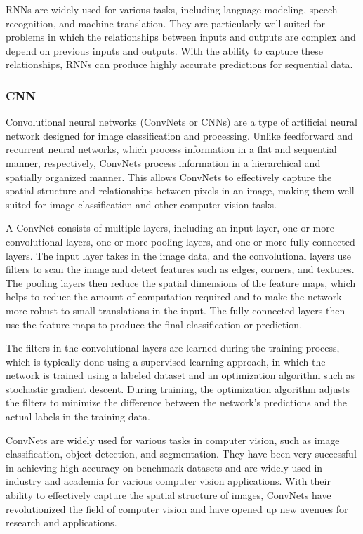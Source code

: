 \documentclass[12pt, a4paper, oneside]{article}
\begin{document}
RNNs are widely used for various tasks, including language modeling, speech recognition, and machine translation. They are particularly well-suited for problems in which the relationships between inputs and outputs are complex and depend on previous inputs and outputs. With the ability to capture these relationships, RNNs can produce highly accurate predictions for sequential data.
\subsubsection{CNN}
Convolutional neural networks (ConvNets or CNNs) are a type of artificial neural network designed for image classification and processing. Unlike feedforward and recurrent neural networks, which process information in a flat and sequential manner, respectively, ConvNets process information in a hierarchical and spatially organized manner. This allows ConvNets to effectively capture the spatial structure and relationships between pixels in an image, making them well-suited for image classification and other computer vision tasks.

A ConvNet consists of multiple layers, including an input layer, one or more convolutional layers, one or more pooling layers, and one or more fully-connected layers. The input layer takes in the image data, and the convolutional layers use filters to scan the image and detect features such as edges, corners, and textures. The pooling layers then reduce the spatial dimensions of the feature maps, which helps to reduce the amount of computation required and to make the network more robust to small translations in the input. The fully-connected layers then use the feature maps to produce the final classification or prediction.

The filters in the convolutional layers are learned during the training process, which is typically done using a supervised learning approach, in which the network is trained using a labeled dataset and an optimization algorithm such as stochastic gradient descent. During training, the optimization algorithm adjusts the filters to minimize the difference between the network's predictions and the actual labels in the training data.

ConvNets are widely used for various tasks in computer vision, such as image classification, object detection, and segmentation. They have been very successful in achieving high accuracy on benchmark datasets and are widely used in industry and academia for various computer vision applications. With their ability to effectively capture the spatial structure of images, ConvNets have revolutionized the field of computer vision and have opened up new avenues for research and applications.
\end{document}
